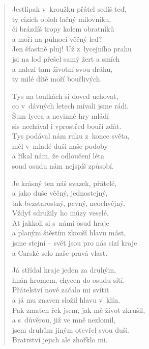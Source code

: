 \begin{verse}
\medskip

Jestlipak v~kroužku přátel sedíš teď,\\
ty cizích obloh lačný milovníku,\\
či brázdíš tropy kolem obratníků\\
a moří na půlnoci věčný led?\\
Jen šťastně pluj! Už z~lycejního prahu\\
jsi na loď přešel samý žert a smích\\
a nalezl tam životní svou dráhu,\\
ty milé dítě moří bouřlivých.

\medskip

Tys na toulkách si doved uchovat,\\
co v~dávných letech mívali jsme rádi.\\
Šum lycea a nevinné hry mládí\\
sis nechával i vprostřed bouří zdát.\\
Tys podával nám ruku z~konce světa,\\
měl v~mladé duši naše podoby\\
a říkal nám, že odloučení léta\\
soud osudu nám nejspíš způsobí.

\medskip

Je krásný ten náš svazek, přátelé,\\
a jako duše věčný, jednostejný,\\
tak bezstarostný, pevný, neochvějný.\\
Vždyť sdružily ho múzy veselé.\\
Ať jakkoli si s~námi osud hraje\\
a planým štěstím zkouší hlavu mást,\\
jsme stejní -- svět jsou pro nás cizí kraje\\
a Carské selo naše pravá vlast.

\medskip

Já střídal kraje jeden za druhým,\\
hnán hromem, chycen do osudu sítí.\\
Přátelství nové začalo mi svítit\\
a já mu znaven složil hlavu v~klín.\\
Pak zmaten řek jsem, jak mě život zkrušil,\\
a s~důvěrou, již ve mně nezlomil,\\
jsem druhům jiným otevřel svou duši.\\
Bratrství jejich ale zhořklo mi.


\end{verse}
